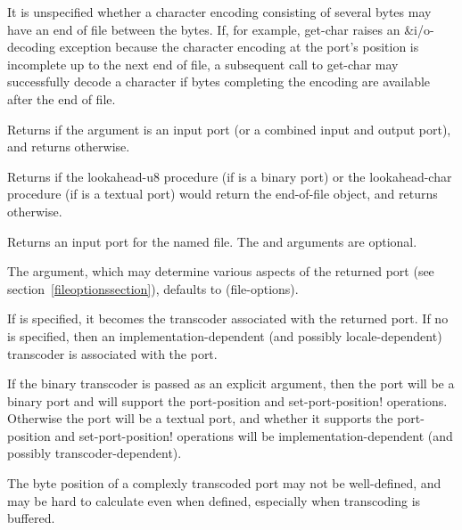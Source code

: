 It is unspecified whether a character encoding consisting of several
bytes may have an end of file between the bytes.  If, for example,
{\cf get-char} raises an {\cf\&i/o-decoding} exception because the
character encoding at the port's position is incomplete up to the next
end of file, a subsequent call to {\cf get-char} may successfully
decode a character if bytes completing the encoding are available
after the end of file.

\begin{entry}{%
}

Returns \schtrue{} if the argument is an input port (or a combined input
and output port), and returns \schfalse{} otherwise.
\end{entry}

\begin{entry}{%
}
   
Returns \schtrue{}
if the {\cf lookahead-u8} procedure (if  is a binary port)
or the {\cf lookahead-char} procedure (if  is a textual port)
would return
the end-of-file object, and returns \schfalse{} otherwise.
\end{entry}

\begin{entry}{%
}
   
Returns an input port for the named file. The  and
 arguments are optional.

The  argument, which may determine
various aspects of the returned port (see section~\ref{fileoptionssection}),
defaults to {\cf (file-options)}.

If  is specified, it becomes the transcoder associated
with the returned port.
If no  is specified, then an implementation-dependent
(and possibly locale-dependent) transcoder is associated with the port.

If the binary transcoder is passed as an explicit argument,
then the port will be a binary port and will support the
{\cf port-position} and {\cf set-port-position!}  operations.
Otherwise the port will be a textual port, and whether it supports
the {\cf port-position} and {\cf set-port-position!} operations
will be implementation-dependent (and possibly transcoder-dependent).

\begin{rationale}
  The byte position of a complexly transcoded port may not be
  well-defined, and may be hard to calculate even when defined,
  especially when transcoding is buffered.
\end{rationale}
\end{entry}

